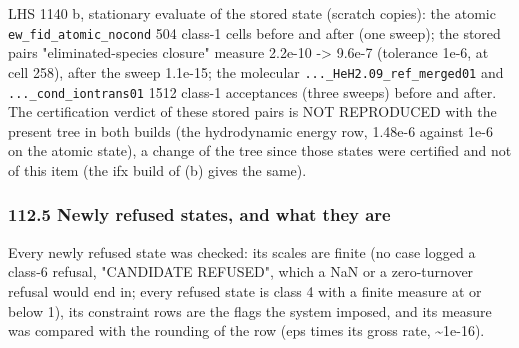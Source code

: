 \documentclass[english,a4paper]{my_memo}
\begin{document}
LHS 1140 b, stationary evaluate of the stored state (scratch copies): the
atomic \texttt{ew\_fid\_atomic\_nocond} 504 class-1 cells before and after (one
sweep); the stored pair\textquotesingle s "eliminated-species closure" measure 2.2e-10 -\textgreater{}
9.6e-7 (tolerance 1e-6, at cell 258), after the sweep 1.1e-15; the molecular
\texttt{...\_HeH2.09\_ref\_merged01} and \texttt{...\_cond\_iontrans01} 1512 class-1
acceptances (three sweeps) before and after. The certification verdict of
these stored pairs is NOT REPRODUCED with the present tree in both builds
(the hydrodynamic energy row, 1.48e-6 against 1e-6 on the atomic state), a
change of the tree since those states were certified and not of this item
(the ifx build of (b) gives the same).

\subsubsection{112.5 Newly refused states, and what they are}\label{1125-newly-refused-states-and-what-they-are}

Every newly refused state was checked: its scales are finite (no case
logged a class-6 refusal, "CANDIDATE REFUSED", which a NaN or a zero-turnover
refusal would end in; every refused state is class 4 with a finite measure
at or below 1), its constraint rows are the
flags the system imposed, and its measure was compared with the rounding of
the row (eps times its gross rate, \textasciitilde1e-16).
\end{document}
